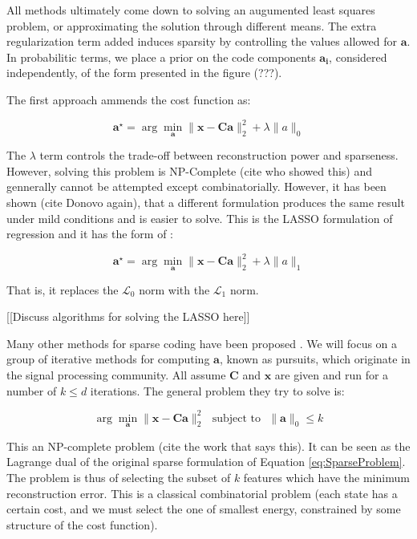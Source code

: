 \documentclass[12pt,a4paper,oneside,english]{UPBThesis}
\begin{document}
All methods ultimately come down to solving an augumented least squares problem, or approximating the solution through different means. The extra regularization term added induces sparsity by controlling the values allowed for $\mathbf{a}$. In probabilitic terms, we place a prior on the code components $\mathbf{a_i}$, considered independently, of the form presented in the figure (???).

The first approach ammends the cost function as:

\begin{equation}
\textbf{a}^{\star} = \arg\min_{\textbf{a}} \| \textbf{x} - \textbf{C}\textbf{a}\|_2^2 + \lambda \|a\|_0
\label{eq:SparseProblem}
\end{equation}

The $\lambda$ term controls the trade-off between reconstruction power and sparseness. However, solving this problem is NP-Complete (cite who showed this) and gennerally cannot be attempted except combinatorially. However, it has been shown (cite Donovo again), that a different formulation produces the same result under mild conditions and is easier to solve. This is the LASSO formulation of regression and it has the form of :

\begin{equation}
\textbf{a}^{\star} = \arg\min_{\textbf{a}} \| \textbf{x} - \textbf{C}\textbf{a}\|_2^2 + \lambda \|a\|_1
\end{equation}

That is, it replaces the $\mathcal{L}_0$ norm with the $\mathcal{L}_1$ norm.

[[Discuss algorithms for solving the LASSO here]]

Many other methods for sparse coding have been proposed \cite{undetermined-minimal-L1,sparse-coding-strategy-V1}. We will focus on a group of iterative methods for computing $\textbf{a}$, known as pursuits, which originate in the signal processing community. All assume $\textbf{C}$ and $\textbf{x}$ are given and run for a number of $k \leq d$ iterations. The general problem they try to solve is:

\begin{equation}
\arg\min_\textbf{a} \|\textbf{x} - \textbf{C}\textbf{a}\|_2^2 \text{~~subject to~~} \|\textbf{a}\|_0 \leq k
\end{equation}

This an NP-complete problem (cite the work that says this). It can be seen as the Lagrange dual of the original sparse formulation of Equation \ref{eq:SparseProblem}. The problem is thus of selecting the subset of $k$ features which have the minimum reconstruction error. This is a classical combinatorial problem (each state has a certain cost, and we must select the one of smallest energy, constrained by some structure of the cost function).
\end{document}
